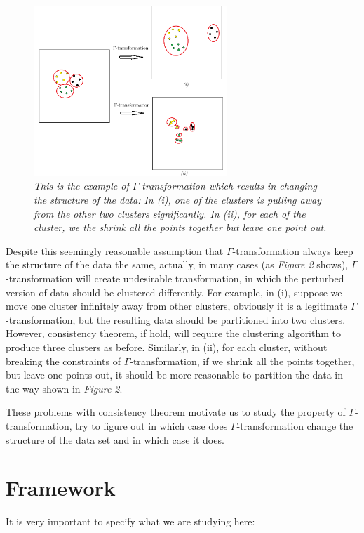\documentclass{uonmathreport}
\begin{document}
\begin{figure}[H]
 \begin{center}
   \includegraphics[width=0.65\textwidth]{Paper_figure_2.png}
 \end{center}
 \caption{\textit{This is the example of $\Gamma$-transformation which results in changing the structure of the data: In (i), one of the clusters is pulling away from the other two clusters significantly. In (ii), for each of the cluster, we the shrink all the points together but leave one point out.}}
 \label{fig:bsd}
\end{figure}

Despite this seemingly reasonable assumption that $\Gamma$-transformation always keep the structure of the data the same, actually, in many cases (as \textit{Figure 2} shows), $\Gamma$-transformation will create undesirable transformation, in which the perturbed version of data should be clustered differently. For example, in (i), suppose we move one cluster infinitely away from other clusters, obviously it is a legitimate $\Gamma$-transformation, but the resulting data should be partitioned into  two clusters. However, consistency theorem, if hold, will require the clustering algorithm to produce three clusters as before. Similarly, in (ii), for each cluster, without breaking the constraints of $\Gamma$-transformation, if we shrink all the points together, but leave one points out, it should be more reasonable to partition the data in the way shown in \textit{Figure 2}.

These problems with consistency theorem motivate us to study the property of $\Gamma$-transformation, try to figure out in which case does $\Gamma$-transformation change the structure of the data set and in which case it does.
\section{Framework} \label{sec:framework}
It is very important to specify what we are studying here:
\end{document}
